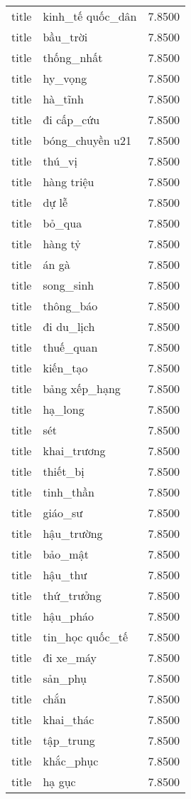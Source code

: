 \documentclass{article}
\begin{document}
\begin{tabular}{lll}
title & kinh\_tế quốc\_dân & 7.8500\\
title & bầu\_trời & 7.8500\\
title & thống\_nhất & 7.8500\\
title & hy\_vọng & 7.8500\\
title & hà\_tĩnh & 7.8500\\
title & đi cấp\_cứu & 7.8500\\
title & bóng\_chuyền u21 & 7.8500\\
title & thú\_vị & 7.8500\\
title & hàng triệu & 7.8500\\
title & dự lễ & 7.8500\\
title & bỏ\_qua & 7.8500\\
title & hàng tỷ & 7.8500\\
title & án gà & 7.8500\\
title & song\_sinh & 7.8500\\
title & thông\_báo & 7.8500\\
title & đi du\_lịch & 7.8500\\
title & thuế\_quan & 7.8500\\
title & kiến\_tạo & 7.8500\\
title & bảng xếp\_hạng & 7.8500\\
title & hạ\_long & 7.8500\\
title & sét & 7.8500\\
title & khai\_trương & 7.8500\\
title & thiết\_bị & 7.8500\\
title & tinh\_thần & 7.8500\\
title & giáo\_sư & 7.8500\\
title & hậu\_trường & 7.8500\\
title & bảo\_mật & 7.8500\\
title & hậu\_thư & 7.8500\\
title & thứ\_trưởng & 7.8500\\
title & hậu\_pháo & 7.8500\\
title & tin\_học quốc\_tế & 7.8500\\
title & đi xe\_máy & 7.8500\\
title & sản\_phụ & 7.8500\\
title & chắn & 7.8500\\
title & khai\_thác & 7.8500\\
title & tập\_trung & 7.8500\\
title & khắc\_phục & 7.8500\\
title & hạ gục & 7.8500\\

\end{tabular}
\end{document}
